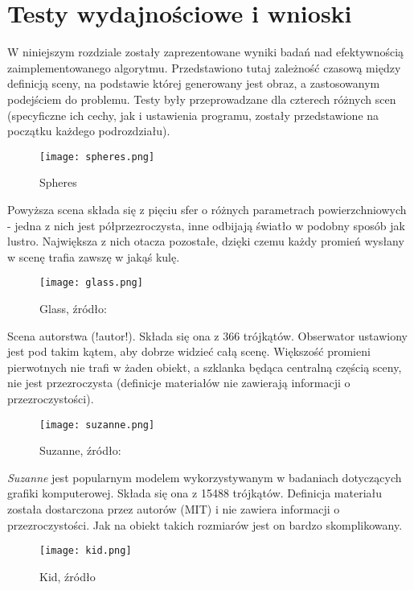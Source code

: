 \section{Testy wydajnościowe i wnioski}

W niniejszym rozdziale zostały zaprezentowane wyniki badań nad efektywnością zaimplementowanego algorytmu. Przedstawiono tutaj zależność czasową między definicją sceny, na podstawie której generowany jest obraz, a zastosowanym podejściem do problemu. Testy były przeprowadzane dla czterech różnych scen (specyficzne ich cechy, jak i ustawienia programu, zostały przedstawione na początku każdego podrozdziału).

\begin{figure}[H]
\centering
  \texttt{[image: spheres.png]}
    \caption{Spheres}
\end{figure}

Powyższa scena składa się z pięciu sfer o różnych parametrach powierzchniowych - jedna z nich jest półprzezroczysta, inne odbijają światło w podobny sposób jak lustro. Największa z nich otacza pozostałe, dzięki czemu każdy promień wysłany w scenę trafia zawszę w jakąś kulę.

\begin{figure}[H]
\centering
  \texttt{[image: glass.png]}
    \caption{Glass, źródło: }
\end{figure}

Scena autorstwa (!autor!). Składa się ona z 366 trójkątów. Obserwator ustawiony jest pod takim kątem, aby dobrze widzieć całą scenę. Większość promieni pierwotnych nie trafi w żaden obiekt, a szklanka będąca centralną częścią sceny, nie jest przezroczysta (definicje materiałów nie zawierają informacji o przezroczystości).
\pagebreak

\begin{figure}[H]
\centering
  \texttt{[image: suzanne.png]}
  \caption{Suzanne, źródło: }
\end{figure}


\emph{Suzanne} jest popularnym modelem wykorzystywanym w badaniach dotyczących grafiki komputerowej. Składa się ona z 15488 trójkątów. Definicja materiału została dostarczona przez autorów (MIT) i nie zawiera informacji o przezroczystości. Jak na obiekt takich rozmiarów jest on bardzo skomplikowany.

\begin{figure}[H]
\centering
  \texttt{[image: kid.png]}
  \caption{Kid, źródło}
\end{figure}

